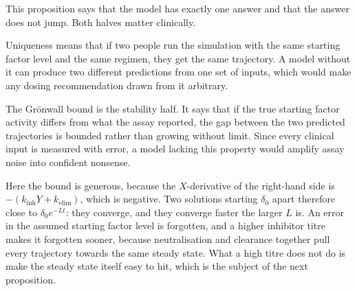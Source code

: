 \begin{reading}
This proposition says that the model has exactly one answer and that the answer
does not jump. Both halves matter clinically.

Uniqueness means that if two people run the simulation with the same starting
factor level and the same regimen, they get the same trajectory. A model
without it can produce two different predictions from one set of inputs, which
would make any dosing recommendation drawn from it arbitrary.

The Gr\"onwall bound is the stability half. It says that if the true
starting factor activity differs from what the assay reported, the gap between
the two predicted trajectories is bounded rather than growing without limit.
Since every clinical input is measured with error, a model lacking this
property would amplify assay noise into confident nonsense.

Here the bound is generous, because the $X$-derivative of the right-hand side
is $-(k_{\text{inh}}Y+k_{\text{elim}})$, which is negative. Two solutions
starting $\delta_0$ apart therefore close to $\delta_0e^{-Lt}$: they converge,
and they converge faster the larger $L$ is. An error in the assumed starting
factor level is forgotten, and a higher inhibitor titre makes it forgotten
sooner, because neutralisation and clearance together pull every trajectory
towards the same steady state. What a high titre does not do is make the
steady state itself easy to hit, which is the subject of the next
proposition.
\end{reading}

